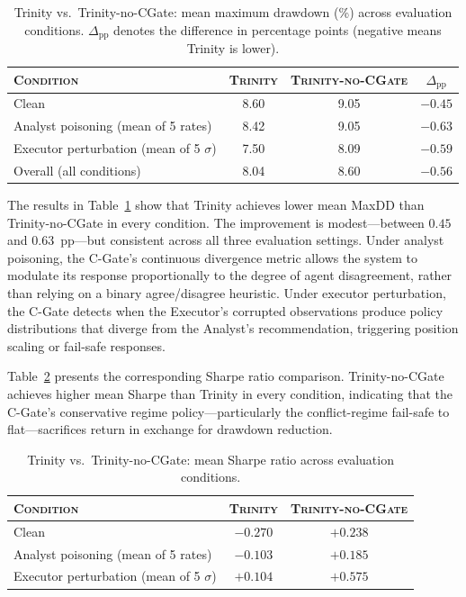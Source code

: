 \begin{table}[h]
\centering
\caption{Trinity vs.\ Trinity-no-CGate: mean maximum drawdown (\%) across
  evaluation conditions. $\Delta_{\text{pp}}$ denotes the difference in
  percentage points (negative means Trinity is lower).}
\label{tab:ablation}
\begin{tabular}{lccc}
\toprule
\textsc{Condition} & \textsc{Trinity} & \textsc{Trinity-no-CGate} &
  $\Delta_{\text{pp}}$ \\
\midrule
Clean                              & 8.60 & 9.05 & $-0.45$ \\
Analyst poisoning (mean of 5 rates) & 8.42 & 9.05 & $-0.63$ \\
Executor perturbation (mean of 5 $\sigma$) & 7.50 & 8.09 & $-0.59$ \\
\midrule
Overall (all conditions)           & 8.04 & 8.60 & $-0.56$ \\
\bottomrule
\end{tabular}
\end{table}

The results in Table~\ref{tab:ablation} show that Trinity achieves lower
mean MaxDD than Trinity-no-CGate in every condition. The improvement is
modest---between $0.45$ and $0.63$~pp---but consistent across all three
evaluation settings. Under analyst poisoning, the C-Gate's continuous
divergence metric allows the system to modulate its response proportionally
to the degree of agent disagreement, rather than relying on a binary
agree/disagree heuristic. Under executor perturbation, the C-Gate detects
when the Executor's corrupted observations produce policy distributions
that diverge from the Analyst's recommendation, triggering position
scaling or fail-safe responses.

Table~\ref{tab:ablation-sharpe} presents the corresponding Sharpe ratio
comparison. Trinity-no-CGate achieves higher mean Sharpe than Trinity in
every condition, indicating that the C-Gate's conservative regime
policy---particularly the conflict-regime fail-safe to flat---sacrifices
return in exchange for drawdown reduction.

\begin{table}[h]
\centering
\caption{Trinity vs.\ Trinity-no-CGate: mean Sharpe ratio across
  evaluation conditions.}
\label{tab:ablation-sharpe}
\begin{tabular}{lcc}
\toprule
\textsc{Condition} & \textsc{Trinity} & \textsc{Trinity-no-CGate} \\
\midrule
Clean                              & $-0.270$ & $+0.238$ \\
Analyst poisoning (mean of 5 rates) & $-0.103$ & $+0.185$ \\
Executor perturbation (mean of 5 $\sigma$) & $+0.104$ & $+0.575$ \\
\bottomrule
\end{tabular}
\end{table}

